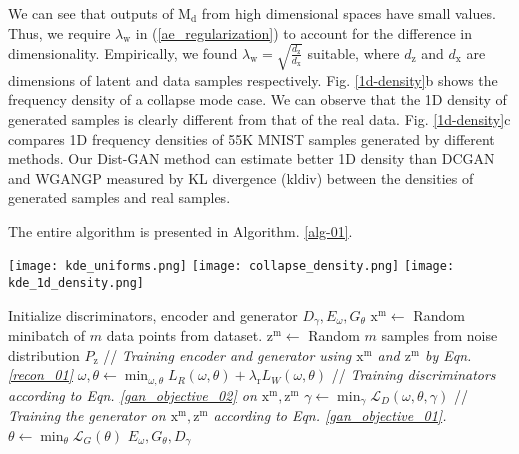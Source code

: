 \documentclass[runningheads]{llncs}
\begin{document}
We can see that outputs of $\mathrm{M_d}$ from high dimensional spaces 
have small values. 
Thus, we require $\lambda_\mathrm{w}$ in 
(\ref{ae_regularization}) to account for the difference in dimensionality.
Empirically, we found $\lambda_\mathrm{w} = \sqrt{\frac{d_\mathrm{z}}{d_\mathrm{x}}}$ suitable, where $d_\mathrm{z}$ and $d_\mathrm{x}$ are dimensions of latent and data samples respectively. 
Fig. \ref{1d-density}b shows the frequency density of a collapse mode case. We can observe that  the 1D density of generated samples is clearly different from that of the real data. Fig. \ref{1d-density}c compares 1D frequency densities of 55K MNIST samples generated by different methods. Our Dist-GAN method can estimate better 1D density than DCGAN and WGANGP measured by KL divergence (kldiv) between the densities of generated samples and real samples. 


The entire algorithm is presented in Algorithm. \ref{alg-01}.
\begin{figure*}
\centering
\texttt{[image: kde\_uniforms.png]}
\texttt{[image: collapse\_density.png]}
\texttt{[image: kde\_1d\_density.png]}
\caption{(a) The 1D frequency density of outputs using $\mathrm{M_d}$ from 
uniform distribution of different dimensionality. (b) One example of the density when mode collapse occurs. (c) The 1D density of real data and generated data obtained by different methods: DCGAN (kldiv: 0.00979), WGANGP (kldiv: 0.00412), Dist-GAN$_2$ (without data-latent distance constraint of AE, kldiv: 0.01027), and Dist-GAN (kldiv: 0.00073).}
\label{1d-density}
\end{figure*}
\begin{algorithm*}
 \footnotesize
 \caption{Dist-GAN}
 \begin{algorithmic}[1]
 \STATE Initialize discriminators, encoder and generator $D_\gamma, E_\omega, G_\theta$
 \REPEAT
  \STATE $\mathrm{x^m} \leftarrow$ Random minibatch of $m$ data points from dataset.
  \STATE $\mathrm{z^m} \leftarrow$ Random $m$ samples from noise distribution $P_\mathrm{z}$
  \STATE // \textit{Training encoder and generator using $\mathrm{x^m}$ and $\mathrm{z^m}$ by Eqn. \ref{recon_01}}
  \STATE $\omega, \theta \leftarrow \min_{\omega, \theta} 
  L_R(\omega, \theta) + \lambda_{\mathrm{r}} L_W(\omega, \theta)$
\STATE // \textit{Training discriminators according to Eqn. \ref{gan_objective_02} on $\mathrm{x^m}, \mathrm{z^m}$} \STATE $\gamma \leftarrow \min_{\gamma} \mathcal{L}_D(\omega, \theta, \gamma)$  
  \STATE // \textit{Training the generator on $\mathrm{x^m}, \mathrm{z^m}$  according to Eqn. \ref{gan_objective_01}.} \STATE $\theta \leftarrow \min_{\theta} \mathcal{L}_G(\theta)$  \UNTIL
 \RETURN $E_\omega, G_\theta, D_\gamma$ 
 \end{algorithmic} 
 \label{alg-01}
\end{algorithm*} 
\end{document}
